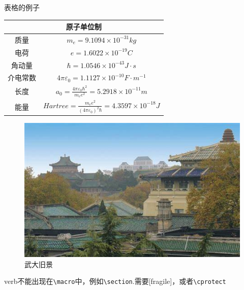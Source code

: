 \documentclass[10pt,aspectratio=169]{beamer}
\begin{document}
\begin{frame}[fragile]{表格的例子}
    \begin{minipage}{0.6\textwidth}
    \begin{table}
    \begin{tabular}{c|c}
        \toprule
        \multicolumn{2}{c}{原子单位制} \\[2pt]
        \hline
        质量&$m_e=9.1094\times 10^{-31}kg$\\
        电荷&$e=1.6022\times 10^{-19}C$\\
        角动量&$\hbar=1.0546\times 10^{-43}J\cdot s$\\
        介电常数&$4\pi\varepsilon_0=1.1127\times 10^{-10}F\cdot m^{-1}$\\
        长度&$a_0=\frac{4\pi\varepsilon_0\hbar^2}{m_ee^2}=5.2918\times 10^{-11}m$\\
        能量&$Hartree=\frac{m_ee^2}{(4\pi\varepsilon_0)^2\hbar}=4.3597\times 10^{-18}J$\\
        \bottomrule
    \end{tabular}
\end{table}
\end{minipage}
\begin{minipage}{0.36\textwidth}
    \begin{figure}
        \includegraphics[width=\textwidth]{source/oldphoto.jpg}
        \caption{武大旧景}
    \end{figure}
\end{minipage}
\newline
verb不能出现在\verb|\macro|中，例如\verb|\section|.需要[fragile]，或者\verb|\cprotect|
\end{frame}
\end{document}
